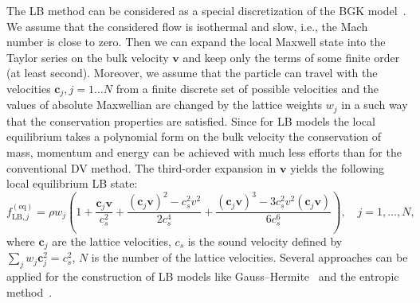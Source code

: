 \documentclass[]{elsarticle} %
\newcommand{\bv}{\boldsymbol{v}}
\newcommand{\bc}{\boldsymbol{c}}
\newcommand{\equil}[1]{#1^\mathrm{(eq)}}
\newcommand{\LB}{\mathrm{LB}}
\begin{document}
The LB method can be considered as a special discretization of the BGK model~\cite{Succi2001}.
We assume that the considered flow is isothermal and slow, i.e., the Mach number is close to zero. Then we can expand the local Maxwell state into the Taylor series on the bulk velocity $\bv$ and keep only the
terms of some finite order (at least second).
Moreover, we assume that the particle can travel with the velocities $\bc_{j}, j=1 \ldots N$ from a finite discrete set of possible velocities
and the values of absolute Maxwellian are changed by the lattice weights $w_j$ in a such way that  the conservation properties are satisfied. Since for LB models the local equilibrium takes a polynomial form on the bulk velocity the conservation of mass, momentum and energy can be achieved with much less efforts than for the conventional DV method.
The third-order expansion in $\bv$ yields the following local equilibrium LB state:
\begin{equation}\label{eq:lbgk}
    \equil{f}_{\LB,j} = \rho w_j\left(1+ \frac{\bc_j\bv}{c_s^2}+\frac{(\bc_j\bv)^2-c_s^2v^2}{2c_s^4}
    + \frac{(\bc_j\bv)^3-3c_s^2 v^2(\bc_j\bv)}{6c_s^6}\right), \quad j=1,\ldots,N,
\end{equation}
where $\bc_j$ are the lattice velocities, $c_s$ is the sound velocity defined by $\sum_jw_j\bc^2_j=c_s^2$,
$N$ is the number of the lattice velocities.
Several approaches can be applied for the construction of LB models like Gauss--Hermite~\cite{He1997, Shan1998, Shan2006, Shan2010}
and the entropic method~\cite{Karlin1999, Chikatamarla2006, Chikatamarla2009}.




\end{document}
